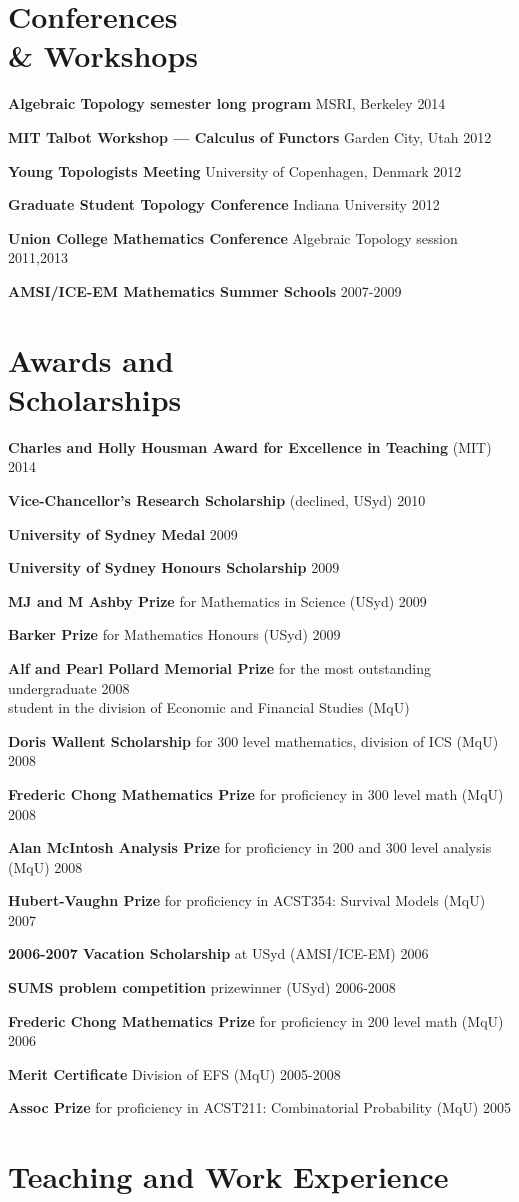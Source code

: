 \documentclass[margin,line]{resume}
\newcommand{\CVsection}[1]{\section{\mysidestyle #1}}
\newcommand{\entry}[3]{\textbf{#1} #2 \hfill {#3}
           
\vspace{-2.7mm}}
\newcommand{\twolineentry}[4]{\textbf{#1} #2 \hfill {#4}\\%
#3
           
\vspace{-2.7mm}}
\newcommand{\FINALentry}[3]{\textbf{#1} #2 \hfill {#3}}
\begin{document}
\begin{resume}
\CVsection{Conferences \\ \& Workshops}

\entry{Algebraic Topology semester long program}{MSRI, Berkeley}{2014}
\entry{MIT Talbot Workshop --- Calculus of Functors}{Garden City, Utah}{2012}
\entry{Young Topologists Meeting}{University of Copenhagen, Denmark}{2012}
\entry{Graduate Student Topology Conference}{Indiana University}{2012}
\entry{Union College Mathematics Conference}{Algebraic Topology session}{2011,2013}
\FINALentry{AMSI/ICE-EM Mathematics Summer Schools}{}%
{2007-2009}


\CVsection{Awards and\\Scholarships} 

\entry{Charles and Holly Housman Award for Excellence in Teaching}{(MIT)}{2014}
\entry{Vice-Chancellor's Research Scholarship}{(declined, USyd)}{2010}
\entry{University of Sydney Medal}{}{2009}
\entry{University of Sydney Honours Scholarship}{}{2009}
\entry{MJ and M Ashby Prize}{for Mathematics in Science (USyd)}{2009}
\entry{Barker Prize}{for Mathematics Honours (USyd)}{2009}
\twolineentry{Alf and Pearl Pollard Memorial Prize}{for the most outstanding undergraduate}{student in the division of Economic and Financial Studies (MqU)}{2008}
\entry{Doris Wallent Scholarship}{for 300 level mathematics, division of ICS (MqU)}{2008}
\entry{Frederic Chong Mathematics Prize}{for proficiency in 300 level math (MqU)}{2008}
\entry{Alan McIntosh Analysis Prize}{for proficiency in 200 and 300 level analysis (MqU)}{2008}
\entry{Hubert-Vaughn Prize}{for proficiency in ACST354: Survival Models (MqU)}{2007}
\entry{2006-2007 Vacation Scholarship}{at USyd (AMSI/ICE-EM)}{2006}
\entry{SUMS problem competition}{prizewinner (USyd)}{2006-2008}
\entry{Frederic Chong Mathematics Prize}{for proficiency in 200 level math (MqU)}{2006}
\entry{Merit Certificate}{Division of EFS (MqU)}{2005-2008}
\FINALentry{Assoc Prize}{for proficiency in ACST211: Combinatorial Probability (MqU)}{2005}


\CVsection{Teaching and Work Experience}


\end{resume}
\end{document}
